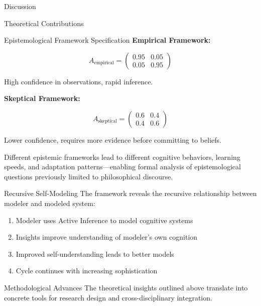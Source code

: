 \documentclass[
  ignorenonframetext,
]{beamer}
\providecommand{\tightlist}{%
  \setlength{\itemsep}{0pt}\setlength{\parskip}{0pt}}
\begin{document}
\begin{frame}{Discussion}
\begin{block}{Theoretical Contributions}
\begin{block}{Epistemological Framework Specification}
\textbf{Empirical Framework:}

\begin{equation}
A_{\text{empirical}} = \begin{pmatrix} 0.95 & 0.05 \\ 0.05 & 0.95 \end{pmatrix}
\label{eq:empirical_framework}
\end{equation}

High confidence in observations, rapid inference.

\textbf{Skeptical Framework:}

\begin{equation}
A_{\text{skeptical}} = \begin{pmatrix} 0.6 & 0.4 \\ 0.4 & 0.6 \end{pmatrix}
\label{eq:skeptical_framework}
\end{equation}

Lower confidence, requires more evidence before committing to beliefs.

Different epistemic frameworks lead to different cognitive behaviors,
learning speeds, and adaptation patterns---enabling formal analysis of
epistemological questions previously limited to philosophical discourse.
\end{block}

\begin{block}{Recursive Self-Modeling}
\protect{}\label{recursive-self-modeling}
The framework reveals the recursive relationship between modeler and
modeled system:

\begin{enumerate}
\tightlist
\item
  Modeler uses Active Inference to model cognitive systems
\item
  Insights improve understanding of modeler's own cognition
\item
  Improved self-understanding leads to better models
\item
  Cycle continues with increasing sophistication
\end{enumerate}
\end{block}
\end{block}

\begin{block}{Methodological Advances}
\protect{}\label{sec:methodological_advances}
The theoretical insights outlined above translate into concrete tools
for research design and cross-disciplinary integration.


\end{block}
\end{frame}
\end{document}
